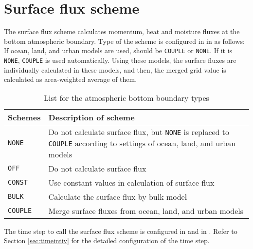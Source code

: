 \section{Surface flux scheme} \label{sec:basic_usel_surface}
The surface flux scheme calculates momentum, heat and moisture fluxes at the bottom atmospheric boundary.
Type of the scheme is configured in  in  as follows:
If ocean, land, and urban models are used,  should be \verb|COUPLE| or \verb|NONE|.
If it is \verb|NONE|, \verb|COUPLE| is used automatically.
Using these models, the surface fluxes are individually calculated in these models, and then, the merged grid value is calculated as area-weighted average of them.

\begin{table}[htb]
\begin{center}
  \caption{List for the atmospheric bottom boundary types}
  \label{tab:nml_atm_sf}
  \begin{tabularx}{150mm}{lX} \hline
    \rowcolor[gray]{0.9}  Schemes & Description of scheme\\ \hline
      \verb|NONE   | & Do not calculate surface flux, but \verb|NONE| is replaced to \verb|COUPLE| according to settings of ocean, land, and urban models \\
      \verb|OFF    | & Do not calculate surface flux \\
      \verb|CONST  | & Use constant values in calculation of surface flux \\
      \verb|BULK   | & Calculate the surface flux by bulk model \\
      \verb|COUPLE | & Merge surface fluxes from ocean, land, and urban models \\
    \hline
  \end{tabularx}
\end{center}
\end{table}


The time step to call the surface flux scheme is configured in  and  in .
Refer to Section \ref{sec:timeintiv} for the detailed configuration of the time step.



